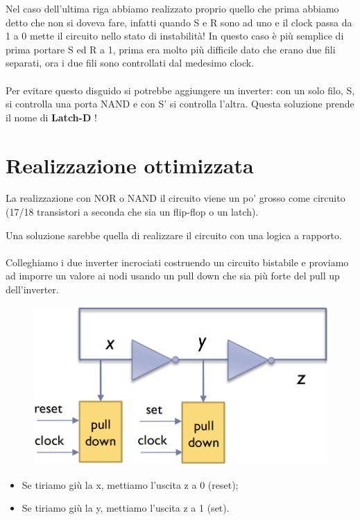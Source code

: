 Nel caso dell'ultima riga abbiamo realizzato proprio quello che prima abbiamo detto che non si doveva fare, infatti quando S e R sono ad uno e il clock passa da 1 a 0 mette il circuito nello stato di instabilità! In questo caso è più semplice di prima portare S ed R a 1, prima era molto più difficile dato che erano due fili separati, ora i due fili sono controllati dal medesimo clock.

\paragraph{}
Per evitare questo disguido si potrebbe aggiungere un inverter: con un solo filo, S, si controlla una porta NAND e con S' si controlla l'altra.
Questa soluzione prende il nome di \textbf{Latch-D} !

\section{Realizzazione ottimizzata}

La realizzazione con NOR o NAND il circuito viene un po' grosso come circuito (17/18 transistori a seconda che sia un flip-flop o un latch).


Una soluzione sarebbe quella di realizzare il circuito con una logica a rapporto.

\paragraph{}
Colleghiamo i due inverter incrociati costruendo un circuito bistabile e proviamo ad imporre un valore ai nodi usando un pull
down che sia più forte del pull up dell'inverter.

\begin{figure}[htbp]
    \centering
    \includegraphics[width=0.45\linewidth]{img/real_ottimiz.png}
\end{figure}


\begin{itemize}
    \item Se tiriamo giù la x, mettiamo l'uscita z a 0 (reset);
    \item Se tiriamo giù la y, mettiamo l'uscita z a 1 (set).
\end{itemize}

